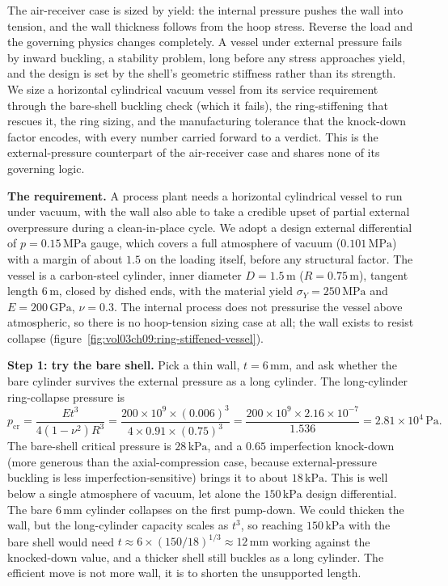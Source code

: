 The air-receiver case is sized by yield: the internal pressure pushes the
wall into tension, and the wall thickness follows from the hoop stress.
Reverse the load and the governing physics changes completely. A vessel
under external pressure fails by inward buckling, a stability problem,
long before any stress approaches yield, and the design is set by the
shell's geometric stiffness rather than its strength. We size a
horizontal cylindrical vacuum vessel from its service requirement through
the bare-shell buckling check (which it fails), the ring-stiffening that
rescues it, the ring sizing, and the manufacturing tolerance that the
knock-down factor encodes, with every number carried forward to a
verdict. This is the external-pressure counterpart of the air-receiver
case and shares none of its governing logic.

\textbf{The requirement.} A process plant needs a horizontal cylindrical
vessel to run under vacuum, with the wall also able to take a credible
upset of partial external overpressure during a clean-in-place cycle. We
adopt a design external differential of $p = 0.15\,\text{MPa}$ gauge,
which covers a full atmosphere of vacuum ($0.101\,\text{MPa}$) with a
margin of about $1.5$ on the loading itself, before any structural
factor. The vessel is a carbon-steel cylinder, inner diameter $D = 1.5\,
\si{\meter}$ ($R = 0.75\,\si{\meter}$), tangent length $6\,\si{\meter}$,
closed by dished ends, with the material yield $\sigma_Y = 250\,\text{
MPa}$ and $E = 200\,\text{GPa}$, $\nu = 0.3$. The internal process does
not pressurise the vessel above atmospheric, so there is no hoop-tension
sizing case at all; the wall exists to resist collapse
(figure~\ref{fig:vol03ch09:ring-stiffened-vessel}).





\textbf{Step 1: try the bare shell.} Pick a thin wall, $t = 6\,\si{
\milli\meter}$, and ask whether the bare cylinder survives the external
pressure as a long cylinder. The long-cylinder ring-collapse pressure is
\[
p_{\text{cr}} = \frac{E t^3}{4(1-\nu^2) R^3}
= \frac{200\times 10^9 \times (0.006)^3}
{4\times 0.91\times (0.75)^3}
= \frac{200\times 10^9 \times 2.16\times 10^{-7}}{1.536}
= 2.81\times 10^4\,\text{Pa}.
\]
The bare-shell critical pressure is $28\,\text{kPa}$, and a $0.65$
imperfection knock-down (more generous than the axial-compression case,
because external-pressure buckling is less imperfection-sensitive) brings
it to about $18\,\text{kPa}$. This is well below a single atmosphere of
vacuum, let alone the $150\,\text{kPa}$ design differential. The bare
$6\,\si{\milli\meter}$ cylinder collapses on the first pump-down. We
could thicken the wall, but the long-cylinder capacity scales as $t^3$,
so reaching $150\,\text{kPa}$ with the bare shell would need
$t \approx 6\times (150/18)^{1/3} \approx 12\,\si{\milli\meter}$ working
against the knocked-down value, and a thicker shell still buckles as a
long cylinder. The efficient move is not more wall, it is to shorten the
unsupported length.

